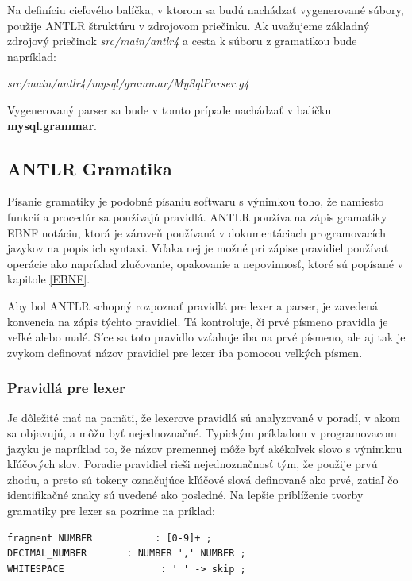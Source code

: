 Na definíciu cieľového balíčka, v ktorom sa budú nachádzať vygenerované súbory, použije \mbox{ANTLR}  štruktúru v zdrojovom priečinku. Ak uvažujeme základný zdrojový priečinok \textit{src/main/antlr4} a cesta k súboru z gramatikou bude napríklad:

\begin{center}
\textit{src/main/antlr4/mysql/grammar/MySqlParser.g4}
\end{center}

Vygenerovaný parser sa bude v tomto prípade nachádzať v balíčku \textbf{mysql.grammar}.

\subsection{ANTLR Gramatika}\label{antlr_grammar}
Písanie gramatiky je podobné písaniu softwaru s výnimkou toho, že namiesto funkcií a procedúr sa používajú pravidlá. ANTLR používa na zápis gramatiky EBNF notáciu, ktorá je zároveň používaná v dokumentáciach programovacích jazykov na popis ich syntaxi. Vďaka nej je možné pri zápise pravidiel používať operácie ako napríklad zlučovanie, opakovanie a nepovinnosť, ktoré sú popísané v kapitole \ref{EBNF}.

Aby bol ANTLR schopný rozpoznať pravidlá pre lexer a parser, je zavedená konvencia na zápis týchto pravidiel. Tá kontroluje, či prvé písmeno pravidla je veľké alebo malé. Síce sa toto pravidlo vzťahuje iba na prvé písmeno, ale aj tak je zvykom definovať názov pravidiel pre lexer iba pomocou veľkých písmen. 

\subsubsection{Pravidlá pre lexer}
Je dôležité mať na pamäti, že lexerove pravidlá sú analyzované v poradí, v akom sa objavujú, a môžu byť nejednoznačné. Typickým príkladom v programovacom jazyku je napríklad to, že názov premennej môže byť akékoľvek slovo s výnimkou kľúčových slov. Poradie pravidiel rieši nejednoznačnosť tým, že použije prvú zhodu, a preto sú tokeny označujúce kľúčové slová definované ako prvé, zatiaľ čo identifikačné znaky sú uvedené ako posledné. Na lepšie priblíženie tvorby gramatiky pre lexer sa pozrime na príklad:

\begin{lstlisting}[basicstyle=\small, keepspaces=true]
fragment NUMBER           : [0-9]+ ;
DECIMAL_NUMBER       : NUMBER ',' NUMBER ;
WHITESPACE                 : ' ' -> skip ;
\end{lstlisting}

